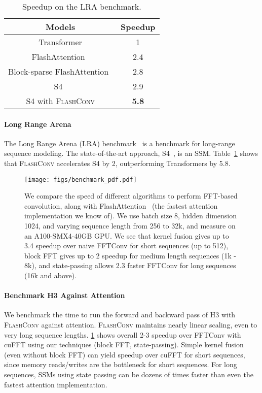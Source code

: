 \documentclass{article}
\newcommand{\fastfft}{\textsc{FlashConv}\xspace}
\newcommand{\hthree}{\textsc{H3}\xspace}
\newcommand{\num}[1]{{\color{red}\bf{#1}\normalfont}}
\newcommand{\num}[1]{#1}
\begin{document}
\begin{table}[t]
    \centering
    \caption{\label{table:lra} Speedup on the LRA benchmark.}
    \centering
    \small
\begin{tabular}{|c|c|}
\hline
    Models &  Speedup \\
    \hline
    Transformer & 1  \\
    FlashAttention~\citep{dao2022flashattention} & 2.4 \\
    Block-sparse FlashAttention~\citep{dao2022flashattention} & 2.8 \\
\hline
S4~\citep{gu2022train} & 2.9 \\
S4 with \fastfft & \num{5.8} \\ \hline
\end{tabular}


%
 \end{table}

\paragraph{Long Range Arena}
The Long Range Arena (LRA) benchmark~\citep{tay2020long} is a benchmark for long-range sequence modeling.
The state-of-the-art approach, S4~\citep{gu2022train}, is an SSM.
Table~\ref{table:lra} shows that \fastfft accelerates S4 by 2, outperforming Transformers by 5.8.

\begin{figure}
    \centering
    \texttt{[image: figs/benchmark\_pdf.pdf]}
    \caption{\label{fig:fftconv_speed}
      We compare the speed of different algorithms to perform FFT-based
      convolution, along with FlashAttention~\citep{dao2022flashattention} (the fastest attention
      implementation we know of).
      We use batch size 8, hidden dimension 1024, and varying sequence length
      from 256 to 32k, and measure on an A100-SMX4-40GB GPU.
      We see that kernel fusion gives up to 3.4 speedup over naive FFTConv
      for short sequences (up to 512), block FFT gives up to 2 speedup for
      medium length sequences (1k - 8k), and state-passing allows 2.3 faster
      FFTConv for long sequences (16k and above).
    }
\end{figure} \paragraph{Benchmark \hthree Against Attention}
We benchmark the time to run the forward and backward pass of \hthree with \fastfft against attention.
\fastfft maintains nearly linear scaling, even to very long sequence lengths.
\cref{fig:fftconv_speed} shows overall 2-3 speedup over FFTConv with cuFFT using our techniques
(block FFT, state-passing).
Simple kernel fusion (even without block FFT) can yield speedup over cuFFT for short sequences, since memory reads/writes are the bottleneck for short sequences.
For long sequences, SSMs using state passing can be dozens of times faster
than even the fastest attention implementation.
\end{document}
